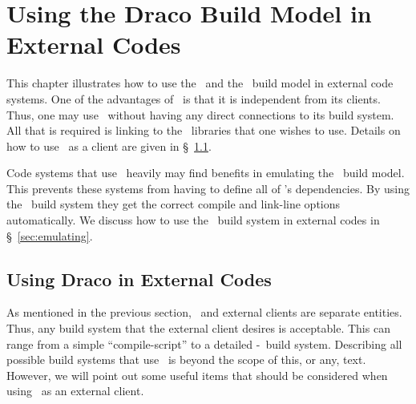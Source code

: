 
\chapter{Using the Draco Build Model in External Codes}
\label{chap:extern}

This chapter illustrates how to use the \draco\ and the \draco\ build
model in external code systems.  One of the advantages of \draco\ is
that it is independent from its clients.  Thus, one may use \draco\ 
without having any direct connections to its build system.  All that
is required is linking to the \draco\ libraries that one wishes to
use.  Details on how to use \draco\ as a client are given in
\S~\ref{sec:using}.

Code systems that use \draco\ heavily may find benefits in emulating
the \draco\ build model.  This prevents these systems from having to
define all of \draco's dependencies.  By using the \draco\ build
system they get the correct compile and link-line options
automatically.  We discuss how to use the \draco\ build system in
external codes in \S~\ref{sec:emulating}.


\section{Using Draco in External Codes}
\label{sec:using}

As mentioned in the previous section, \draco\ and external clients are
separate entities.  Thus, any build system that the external client
desires is acceptable.  This can range from a simple
``compile-script'' to a detailed \autoconf-\gmake\ build system.
Describing all possible build systems that use \draco\ is beyond the
scope of this, or any, text.  However, we will point out some useful
items that should be considered when using \draco\ as an external
client.

